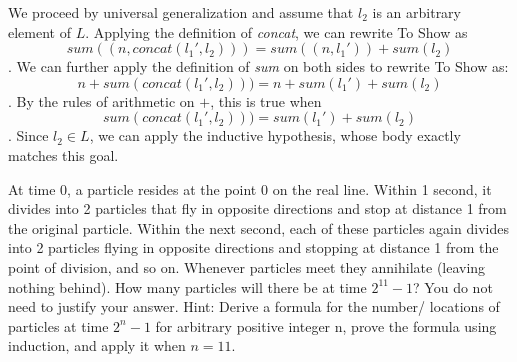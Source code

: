 \begin{description}
\begin{enumerate}
{\begin{itemize}
We proceed by universal generalization and assume that $l_2$ is an arbitrary element of $L$. Applying the definition of \textit{concat}, we can rewrite To Show as $$\textit{sum}((n, \textit{concat}(l_1', l_2))) = \textit{sum}((n, l_1')) + \textit{sum}(l_2)$$. We can further apply the definition of \textit{sum} on both sides to rewrite To Show as: $$n + \textit{sum}(\textit{concat}(l_1', l_2))) = n + \textit{sum}(l_1') + \textit{sum}(l_2)$$. By the rules of arithmetic on $+$, this is true when $$\textit{sum}(\textit{concat}(l_1', l_2))) = \textit{sum}(l_1') + \textit{sum}(l_2)$$. Since $l_2 \in L$, we can apply the inductive hypothesis, whose body exactly matches this goal.

\end{itemize}
}
\fi

\end{enumerate}


\item[13. Induction and Recursion] 
At time 0, a particle resides at the point 0 on the real line.  
Within 1 second, it divides into 2 particles that fly in opposite directions and 
stop at distance 1 from the original particle. Within the next second, 
each of these particles again divides into 2 particles flying in opposite directions 
and stopping at distance 1 from the point of division, and so on. 
Whenever particles meet they annihilate (leaving nothing behind). 
How many particles will there be at time $2^{11} -1$? 
You do not need to justify your answer. 
Hint: Derive a formula for the number/ locations of particles at time $2^n-1$ for arbitrary 
positive integer n, prove the formula using induction, and apply it when $n=11$.

\ifsolution
{}
\end{description}

